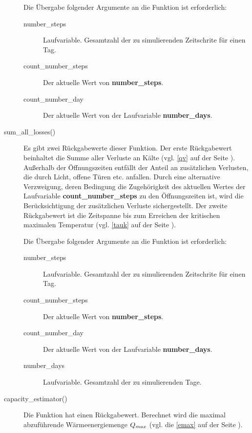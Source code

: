 \begin{description}
	Die \"Ubergabe folgender Argumente an die Funktion ist erforderlich:
	\begin{description}
		\item[number\_steps] Laufvariable. Gesamtzahl der zu
		simulierenden Zeitschrite f\"ur einen Tag.
		\item[count\_number\_steps] Der aktuelle Wert von
		\textbf{number\_steps}.
		\item[count\_number\_day] Der aktuelle Wert von der Laufvariable
		\textbf{number\_days}.
	\end{description}

	\item[sum\_all\_losses()] Es gibt zwei R\"uckgabewerte dieser Funktion.
	Der erste R\"uckgabewert beinhaltet die Summe aller Verluste an K\"alte
	(vgl. \cref{qv} auf der Seite \pageref{qv}).
	Au\ss erhalb der \"Offnungszeiten entf\"allt der Anteil an
	zus\"atzlichen Verlusten, die durch Licht, offene T\"uren etc.
	anfallen. Durch eine alternative Verzweigung, deren Bedingung die
	Zugeh\"origkeit des aktuellen Wertes der Laufvariable
	\textbf{count\_number\_steps} zu den \"Offnungszeiten ist, wird die
	Ber\"ucksichtigung der zus\"atzlichen Verluste sichergestellt. Der
	zweite R\"uckgabewert ist die Zeitspanne bis zum Erreichen der
	kritischen maximalen Temperatur (vgl. \cref{tauk} auf der Seite
	\pageref{tauk}).

	Die \"Ubergabe folgender Argumente an die Funktion ist erforderlich:
	\begin{description}
		\item[number\_steps] Laufvariable. Gesamtzahl der zu
		simulierenden Zeitschrite f\"ur einen Tag.
		\item[count\_number\_steps] Der aktuelle Wert von
		\textbf{number\_steps}.
		\item[count\_number\_day] Der aktuelle Wert von der Laufvariable
		\textbf{number\_days}.
		\item[number\_days] Laufvariable. Gesamtzahl der zu
		simulierenden Tage.
	\end{description}

	\item[capacity\_estimator()] Die Funktion hat einen R\"uckgabewert.
	Berechnet wird die maximal abzuf\"uhrende W\"armeenergiemenge $Q_{max}$
	(vgl. die \cref{emax} auf der Seite \pageref{emax}).


\end{description}
